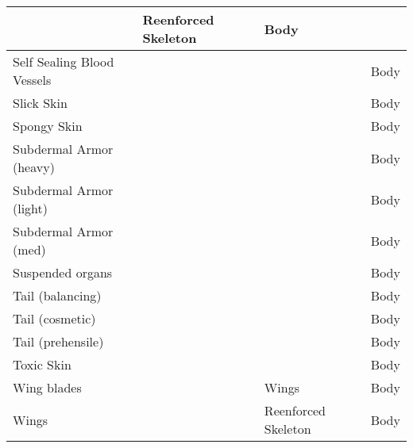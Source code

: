 \documentclass[twoside]{book}
\begin{document}
\begin{longtable}{p{1.25in}p{2em}ll}
  &
   Reenforced Skeleton
           
  &
   Body 
  \tabularnewline
  \hline
      
  \raggedright
           Self Sealing Blood Vessels
           
  &
  
  &
  
  &
   Body 
  \tabularnewline
  \hline
      
  \raggedright
           Slick Skin 
  &
  
  &
  
  &
   Body 
  \tabularnewline
  \hline
      
  \raggedright
           Spongy Skin 
  &
  
  &
  
  &
   Body 
  \tabularnewline
  \hline
      
  \raggedright
           Subdermal Armor (heavy)
           
  &
  
  &
  
  &
   Body 
  \tabularnewline
  \hline
      
  \raggedright
           Subdermal Armor (light)
           
  &
  
  &
  
  &
   Body 
  \tabularnewline
  \hline
      
  \raggedright
           Subdermal Armor (med) 
  &
  
  &
  
  &
   Body 
  \tabularnewline
  \hline
      
  \raggedright
           Suspended organs 
  &
  
  &
  
  &
   Body 
  \tabularnewline
  \hline
      
  \raggedright
           Tail (balancing) 
  &
  
  &
  
  &
   Body 
  \tabularnewline
  \hline
      
  \raggedright
           Tail (cosmetic) 
  &
  
  &
  
  &
   Body 
  \tabularnewline
  \hline
      
  \raggedright
           Tail (prehensile) 
  &
  
  &
  
  &
   Body 
  \tabularnewline
  \hline
      
  \raggedright
           Toxic Skin 
  &
  
  &
  
  &
   Body 
  \tabularnewline
  \hline
      
  \raggedright
           Wing blades 
  &
  
  &
   Wings 
  &
   Body 
  \tabularnewline
  \hline
      
  \raggedright
           Wings 
  &
  
  &
   Reenforced Skeleton
           
  &
   Body 
  \tabularnewline
  \hline
      
\end{longtable}
\end{document}
